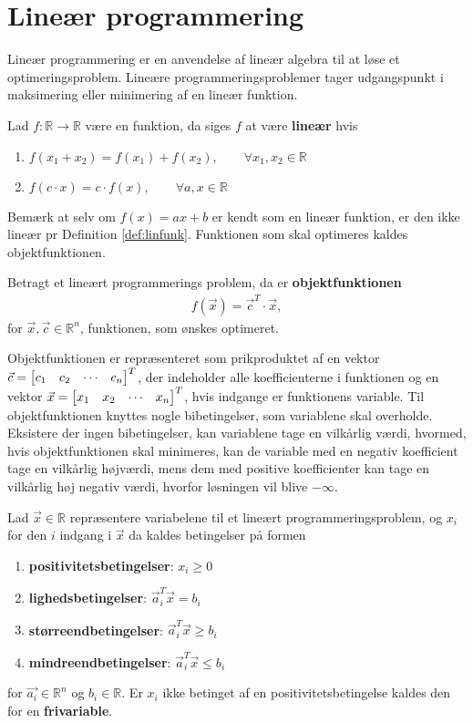 \chapter{Lineær programmering}\label{Afsnit:LinProg}
Lineær programmering er en anvendelse af lineær algebra til at løse et optimeringsproblem. Lineære programmeringsproblemer tager udgangspunkt i maksimering eller minimering af en lineær funktion.
\begin{defn}
Lad $f:\mathds{R} \to \mathds{R}$ være en funktion, da siges $f$ at være \textbf{lineær} hvis
\begin{enumerate}[label=\alph*]
\item $f(x_1 + x_2) = f(x_1) + f(x_2), \qquad \forall x_1,x_2 \in \mathds{R}$
\item $f(c\cdot x) = c \cdot f(x), \qquad \forall a, x \in \mathds{R}$
\end{enumerate}
\label{def:linfunk}
\end{defn}
Bemærk at selv om $f(x) = ax + b$ er kendt som en lineær funktion, er den ikke lineær pr Definition \ref{def:linfunk}.
Funktionen som skal optimeres kaldes objektfunktionen.
\begin{defn}
Betragt et lineært programmerings problem, da er \textbf{objektfunktionen}
\begin{align*}
f(\vec{x}) = \vec{c}^T \cdot \vec{x}, 
\end{align*}
for $\vec{x}, \vec{c} \in \mathds{R}^n$, funktionen, som ønskes optimeret.
\end{defn}
Objektfunktionen er repræsenteret som prikproduktet af en vektor $\vec{c}= \begin{bmatrix} c_1 & c_2 & \cdots & c_n \end{bmatrix}^T$, der indeholder alle koefficienterne i funktionen og en vektor $\vec{x}= \begin{bmatrix} x_1 & x_2 & \cdots & x_n \end{bmatrix}^T$, hvis indgange er funktionens variable.
Til objektfunktionen knyttes nogle bibetingelser, som variablene skal overholde. 
Eksistere der ingen bibetingelser, kan variablene tage en vilkårlig værdi, hvormed, hvis objektfunktionen skal minimeres, kan de variable med en negativ koefficient tage en vilkårlig højværdi, mens dem med positive koefficienter kan tage en vilkårlig høj negativ værdi, hvorfor løsningen vil blive $- \infty$.
\begin{defn}[bibetingelser]
Lad $\vec{x}\in \mathds{R}$ repræsentere variabelene til et lineært programmeringsproblem, og $x_i$ for den $i$ indgang i $\vec{x}$ da kaldes betingelser på formen
\begin{enumerate}
\item \textbf{positivitetsbetingelser}: $x_i \geq 0$
\item \textbf{lighedsbetingelser}: $\vec{a}_i^T\vec{x} = b_i$
\item \textbf{størreendbetingelser}: $\vec{a}_i^T\vec{x} \geq b_i$
\item \textbf{mindreendbetingelser}: $\vec{a}_i^T\vec{x} \leq b_i$
\end{enumerate}
for $\vec{a_i}\in \mathds{R}^n$ og $b_i\in \mathds{R}$. 
Er $x_i$ ikke betinget af en positivitetsbetingelse kaldes den for en \textbf{frivariable}.
\end{defn}
